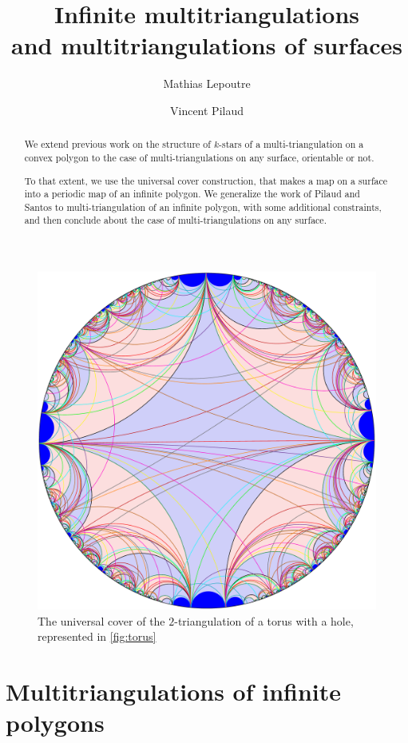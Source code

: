 \documentclass{amsart}
\title[Infinite multitriangulations and multitriangulations of surfaces]{Infinite multitriangulations \\ and multitriangulations of surfaces}
\author{Mathias Lepoutre}
\author{Vincent Pilaud}
\theoremstyle{remark}
\begin{document}
\begin{abstract}
We extend previous work on the structure of $k$-stars of a multi-triangulation on a convex polygon to the case of multi-triangulations on any surface, orientable or not. 

To that extent, we use the universal cover construction, that makes a map on a surface into a periodic map of an infinite polygon. We generalize the work of Pilaud and Santos to multi-triangulation of an infinite polygon, with some additional constraints, and then conclude about the case of multi-triangulations on any surface.
\end{abstract}

\maketitle

\begin{figure}[h]
	\capstart
	\centerline{\includegraphics[scale=.42]{torusClean}}
	\caption{The universal cover of the $2$-triangulation of a torus with a hole, represented in \cref{fig:torus}}
	\label{fig:UCtorus}
\end{figure}


\section{Multitriangulations of infinite polygons}
\end{document}
